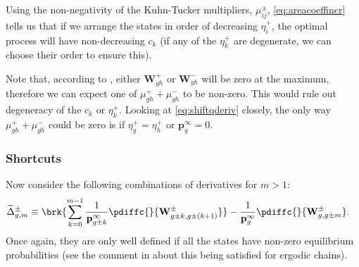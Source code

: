 \documentclass[12pt]{article}
\newcommand{\eq}{\mathbf{p}^\infty}
\newcommand{\W}{\mathbf{W}}
\begin{document}
Using the non-negativity of the Kuhn-Tucker multipliers, $\mu^\pm_{ij}$, \eqref{eq:areacoeffincr} tells us that if we arrange the states in order of decreasing $\eta^+_i$, the optimal process will have non-decreasing $c_k$ (if any of the $\eta^+_k$ are degenerate, we can choose their order to ensure this).

Note that, according to , either $\W^+_{gh}$ or $\W^-_{gh}$ will be zero at the maximum, therefore we can expect one of $\mu^+_{gh}+\mu^-_{gh}$ to be non-zero.
This would rule out degeneracy of the $c_k$ or $\eta^+_k$.
Looking at \eqref{eq:shiftqderiv} closely, the only way $\mu^+_{gh}+\mu^-_{gh}$ could be zero is if $\eta^+_g=\eta^+_h$ or $\eq_g=0$.

\subsubsection{Shortcuts}\label{sec:shortcuts}

Now consider the following combinations of derivatives for $m>1$:
%
\begin{align}
\label{eq:shortcutderiv}
    \widetilde{\Delta}^\pm_{g,m} &\equiv
      \brk{ \sum_{k=0}^{m-1} \frac{1}{\eq_{g\pm k}} \pdiffc{}{\W^\pm_{g\pm k,g\pm(k+1)}} }
      - \frac{1}{\eq_g} \pdiffc{}{\W^\pm_{g,g\pm m}}.
\end{align}
%
Once again, they are only well defined if all the states have non-zero equilibrium probabilities (see the comment in  about this being satisfied for ergodic chains).
\end{document}
